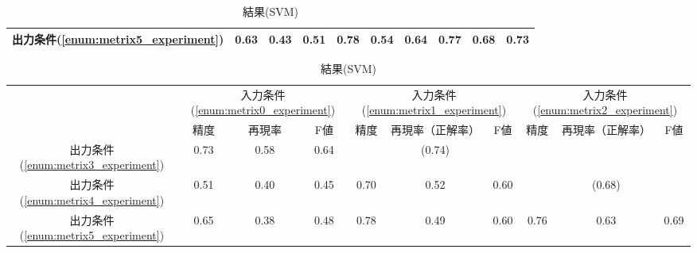 \documentclass[japanese]{jnlp_1.2b}
\begin{document}
\begin{table}[t]
\begin{center}
\begin{tabular}{c|ccc|ccc|ccc}
   出力条件(\ref{enum:metrix5_experiment}) & 0.63 & 0.43 & 0.51  & 0.78
   & 0.54 & 0.64  & 0.77 & 0.68 & 0.73 \\
   \hline
  \end{tabular}
    \par\vspace{20pt}
  \caption{結果(SVM)}
  \label{tbl:result_all_experiment_svm}
  \setlength{\tabcolsep}{1.5mm}
  \begin{tabular}{c|ccc|ccc|ccc}
   \hline
   & \multicolumn{3}{|c|}{入力条件(\ref{enum:metrix0_experiment})}
   & \multicolumn{3}{|c|}{入力条件(\ref{enum:metrix1_experiment})}
   & \multicolumn{3}{|c}{入力条件(\ref{enum:metrix2_experiment})} \\
   & 精度 & 再現率 & F値
   & 精度 & 再現率（正解率） & F値
   & 精度 & 再現率（正解率） & F値 \\
   \hline
   出力条件(\ref{enum:metrix3_experiment}) & 0.73 & 0.58 & 0.64  &  &
   (0.74) &  &  &  & \\
   出力条件(\ref{enum:metrix4_experiment}) & 0.51 & 0.40 & 0.45  & 0.70
   & 0.52 & 0.60  &  & (0.68) & \\
   出力条件(\ref{enum:metrix5_experiment}) & 0.65 & 0.38 & 0.48  & 0.78
   & 0.49 & 0.60  & 0.76 & 0.63 & 0.69 \\
   \hline
  \end{tabular}
 \end{center}
\end{table}
\end{document}
